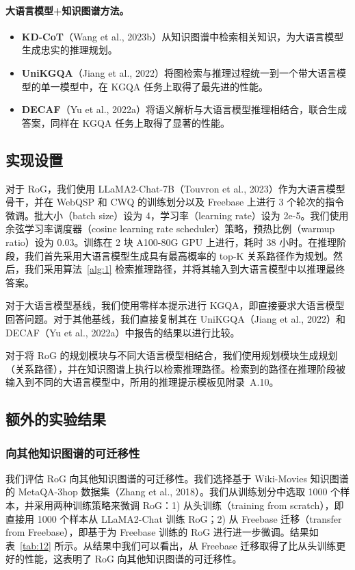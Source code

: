 \documentclass[11pt,UTF8,fontset=fandol]{ctexart}
\begin{document}
\paragraph{大语言模型+知识图谱方法。}
\begin{itemize}[leftmargin=2em]
\item \textbf{KD-CoT}（Wang et al., 2023b）从知识图谱中检索相关知识，为大语言模型生成忠实的推理规划。
\item \textbf{UniKGQA}（Jiang et al., 2022）将图检索与推理过程统一到一个带大语言模型的单一模型中，在 KGQA 任务上取得了最先进的性能。
\item \textbf{DECAF}（Yu et al., 2022a）将语义解析与大语言模型推理相结合，联合生成答案，同样在 KGQA 任务上取得了显著的性能。
\end{itemize}

\subsection{实现设置}
\label{app:a6}

对于 RoG，我们使用 LLaMA2-Chat-7B（Touvron et al., 2023）作为大语言模型骨干，并在 WebQSP 和 CWQ 的训练划分以及 Freebase 上进行 3 个轮次的指令微调。批大小（batch size）设为 4，学习率（learning rate）设为 2e-5。我们使用余弦学习率调度器（cosine learning rate scheduler）策略，预热比例（warmup ratio）设为 0.03。训练在 2 块 A100-80G GPU 上进行，耗时 38 小时。在推理阶段，我们首先采用大语言模型生成具有最高概率的 top-K 关系路径作为规划。然后，我们采用算法~\ref{alg:1} 检索推理路径，并将其输入到大语言模型中以推理最终答案。

对于大语言模型基线，我们使用零样本提示进行 KGQA，即直接要求大语言模型回答问题。对于其他基线，我们直接复制其在 UniKGQA（Jiang et al., 2022）和 DECAF（Yu et al., 2022a）中报告的结果以进行比较。

对于将 RoG 的规划模块与不同大语言模型相结合，我们使用规划模块生成规划（关系路径），并在知识图谱上执行以检索推理路径。检索到的路径在推理阶段被输入到不同的大语言模型中，所用的推理提示模板见附录~A.10。

\subsection{额外的实验结果}

\subsubsection{向其他知识图谱的可迁移性}

我们评估 RoG 向其他知识图谱的可迁移性。我们选择基于 Wiki-Movies 知识图谱的 MetaQA-3hop 数据集（Zhang et al., 2018）。我们从训练划分中选取 1000 个样本，并采用两种训练策略来微调 RoG：1) 从头训练（training from scratch），即直接用 1000 个样本从 LLaMA2-Chat 训练 RoG；2) 从 Freebase 迁移（transfer from Freebase），即基于为 Freebase 训练的 RoG 进行进一步微调。结果如表~\ref{tab:12} 所示。从结果中我们可以看出，从 Freebase 迁移取得了比从头训练更好的性能，这表明了 RoG 向其他知识图谱的可迁移性。
\end{document}
